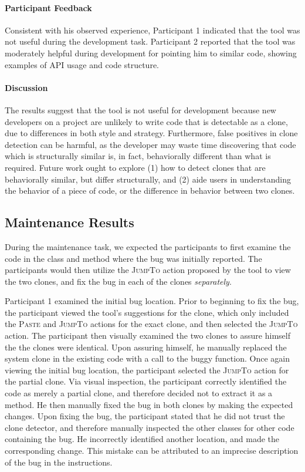 \documentclass[nocopyrightspace,10pt]{sigplanconf}
\begin{document}
\paragraph{Participant Feedback}
Consistent with his observed experience, Participant 1 indicated that
the tool was not useful during the development task. Participant 2
reported that the tool was moderately helpful during development for
pointing him to similar code, showing examples of API usage and code
structure.

\paragraph{Discussion}
The results suggest that the tool is not useful for development
because new developers on a project are unlikely to write code that is
detectable as a clone, due to differences in both style and
strategy. Furthermore, false positives in clone detection can be harmful, as the developer may
waste time discovering that code which is structurally similar is, in fact, behaviorally
different than what is required. Future work ought to explore (1) how
to detect clones that are behaviorally similar, but differ
structurally, and (2) aide users in understanding the behavior of a
piece of code, or the difference in behavior between two clones.

\subsection{Maintenance Results}
During the maintenance task, we expected the participants to first
examine the code in the class and method where the bug was initially
reported. The participants would then utilize the \textsc{JumpTo}
action proposed by the tool to view the two clones, and fix the bug in
each of the clones \textit{separately}.

Participant 1 examined the initial bug location. Prior to beginning to
fix the bug, the participant viewed the tool's suggestions for the
clone, which only included the \textsc{Paste} and \textsc{JumpTo}
actions for the exact clone, and then selected the \textsc{JumpTo}
action. The participant then visually examined the two clones to
assure himself the the clones were identical. Upon assuring himself,
he manually replaced the system clone in the existing code with a call
to the buggy function. Once again viewing the initial bug location,
the participant selected the \textsc{JumpTo} action for the partial
clone. Via visual inspection, the participant correctly identified the
code as merely a partial clone, and therefore decided not to extract
it as a method. He then manually fixed the bug in both clones by
making the expected changes. Upon fixing the bug, the participant
stated that he did not trust the clone detector, and therefore
manually inspected the other classes for other code containing the
bug. He incorrectly identified another location, and made the
corresponding change. This mistake can be attributed to an imprecise
description of the bug in the instructions.
\end{document}
